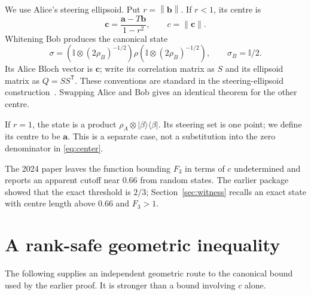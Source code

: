 \documentclass[11pt,a4paper]{article}
\theoremstyle{remark}\newtheorem{remark}[theorem]{Remark}
\newcommand{\Id}{\mathbb I}
\newcommand{\norm}[1]{\left\lVert#1\right\rVert}
\renewcommand{\aa}{\mathbf a}\newcommand{\bb}{\mathbf b}
\newcommand{\cc}{\mathbf c}\newcommand{\nn}{\mathbf n}
\begin{document}
We use Alice's steering ellipsoid. Put $r=\norm\bb$. If $r<1$, its centre is
\begin{equation}\label{eq:center}
\cc=\frac{\aa-T\bb}{1-r^2},\qquad c=\norm\cc.
\end{equation}
Whitening Bob produces the canonical state
\begin{equation}\label{eq:white}
\sigma=(\Id\otimes(2\rho_B)^{-1/2})\rho(\Id\otimes(2\rho_B)^{-1/2}),
\qquad \sigma_B=\Id/2.
\end{equation}
Its Alice Bloch vector is $\cc$; write its correlation matrix as $S$ and its
ellipsoid matrix as $Q=SS^{\mathsf T}$. These conventions are standard in the
steering-ellipsoid construction~\cite{jevtic,milne}. Swapping Alice and Bob
gives an identical theorem for the other centre.

If $r=1$, the state is a product $\rho_A\otimes|\beta\rangle\langle\beta|$.
Its steering set is one point; we define its centre to be $\aa$. This is a
separate case, not a substitution into the zero denominator in
\eqref{eq:center}.

The 2024 paper leaves the function bounding $F_3$ in terms of $c$ undetermined
and reports an apparent cutoff near $0.66$ from random states. The earlier
package~\cite{earlier} showed that the exact threshold is $2/3$;
Section~\ref{sec:witness} recalls an exact state with centre length above
$0.66$ and $F_3>1$.

\section{A rank-safe geometric inequality}\label{sec:geometric}
The following supplies an independent geometric route to the canonical bound
used by the earlier proof. It is stronger than a bound involving $c$ alone.
\end{document}
